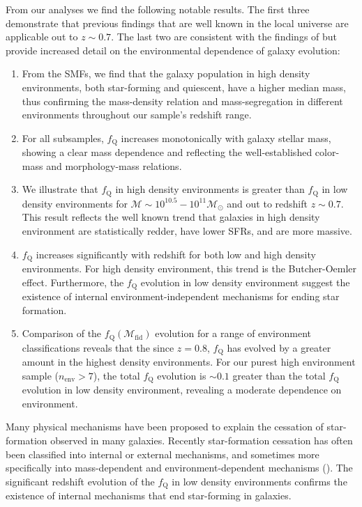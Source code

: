 From our analyses we find the following notable results. The first
three demonstrate that previous findings that are well known in the
local universe are applicable out to $z\sim 0.7$. The last two are
consistent with the findings of \cite{Peng:2010aa} but provide increased
detail on the environmental dependence of galaxy evolution:
\begin{enumerate}
	\item From the SMFs, we find that the galaxy population in high
    density environments, both star-forming and quiescent, have a
    higher median mass, thus confirming the mass-density relation and
    mass-segregation in different environments throughout our sample's
    redshift range.
	\item For all subsamples, $f_{\mathrm{Q}}$ increases monotonically with
    galaxy stellar mass, showing a clear mass dependence and
    reflecting the well-established color-mass and morphology-mass
    relations.
	\item We illustrate that $f_{\mathrm{Q}}$ in high density environments
    is greater than $f_{\mathrm{Q}}$ in low density environments
    for $\mathcal{M} \sim 10^{10.5} -10^{11} \mathcal{M}_\odot$ and out to redshift $z\sim 0.7$. This result
    reflects the well known trend that galaxies in high density
    environment are statistically redder, have lower SFRs, and are
    more massive.
	\item $f_{\mathrm{Q}}$ increases significantly with redshift for both
    low and high density environments. For high density environment,
    this trend is the Butcher-Oemler effect. Furthermore, the
    $f_{\mathrm{Q}}$ evolution in low density environment suggest the
    existence of internal environment-independent mechanisms for
    ending star formation.
	\item Comparison of the $f_{\mathrm{Q}}(\mathcal{M}_{\mathrm{fid}})$
    evolution for a range of environment classifications reveals that
    the since $z = 0.8$, $f_{\mathrm{Q}}$ has evolved by a greater amount
    in the highest density environments. For our purest high
    environment sample ($n_{\mathrm{env}} > 7$), the total $f_{\mathrm{Q}}$
    evolution is $\sim 0.1$ greater than the total $f_{\mathrm{Q}}$
    evolution in low density environment, revealing a moderate
    dependence on environment.
\end{enumerate}

Many physical mechanisms have been proposed to explain the cessation
of star-formation observed in many galaxies. Recently star-formation
cessation has often been classified into internal or external
mechanisms, and sometimes more specifically into mass-dependent and
environment-dependent mechanisms (\citealt{Baldry:2006aa,
  Peng:2010aa}). The significant redshift evolution of the
$f_{\mathrm{Q}}$ in low density environments confirms the existence of
internal mechanisms that end star-forming in galaxies.

